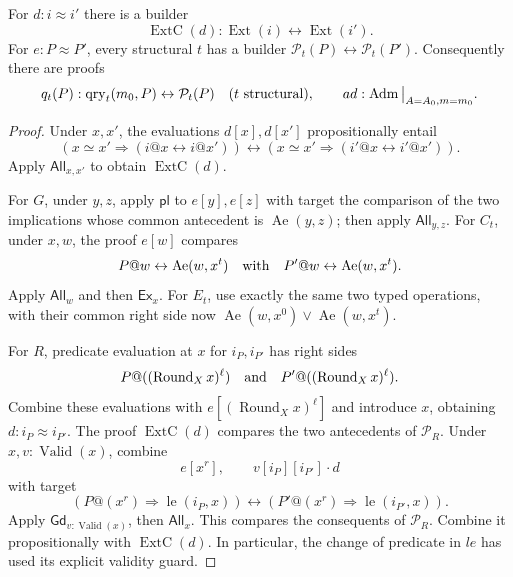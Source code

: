 \begin{lemma}
\label{rel-query-realization}
For \(d:i\approx i'\) there is a builder
\[
 \operatorname{ExtC}(d):
       \operatorname{Ext}(i)\leftrightarrow\operatorname{Ext}(i').
\]
For \(e:P\approx P'\), every structural \(t\) has a builder
\(\mathcal P_t(P)\leftrightarrow\mathcal P_t(P')\).
Consequently there are proofs
\[
 q_t(P):\operatorname{qry}_t(m_0,P)\leftrightarrow\mathcal P_t(P)
 \quad(t\ {\rm structural}),\qquad
 ad:\operatorname{Adm}\big|_{A=A_0,m=m_0}.
\]
\end{lemma}
\begin{proof}
Under \(x,x'\), the evaluations \(d[x],d[x']\) propositionally
entail
\[
 (x\simeq x'\Rightarrow(i@x\leftrightarrow i@x'))
 \leftrightarrow
 (x\simeq x'\Rightarrow(i'@x\leftrightarrow i'@x')).
\]
Apply \(\mathsf{All}_{x,x'}\) to obtain
\(\operatorname{ExtC}(d)\).

For \(G\), under \(y,z\), apply \(\mathsf{pl}\) to
\(e[y],e[z]\) with target the comparison of the two implications
whose common antecedent is \(\operatorname{Ae}(y,z)\);
then apply \(\mathsf{All}_{y,z}\).
For \(C_t\), under \(x,w\), the proof \(e[w]\) compares
\[
 P@w\leftrightarrow\operatorname{Ae}(w,x^t)
 \quad\hbox{with}\quad
 P'@w\leftrightarrow\operatorname{Ae}(w,x^t).
\]
Apply \(\mathsf{All}_w\) and then \(\mathsf{Ex}_x\).
For \(E_t\), use exactly the same two typed operations, with
their common right side now
\(\operatorname{Ae}(w,x^0)\lor\operatorname{Ae}(w,x^t)\).

For \(R\), predicate evaluation at \(x\) for \(i_P,i_{P'}\)
has right sides
\[
 P@((\operatorname{Round}_Xx)^\ell)
 \quad\hbox{and}\quad P'@((\operatorname{Round}_Xx)^\ell).
\]
Combine these evaluations with
\(e[(\operatorname{Round}_Xx)^\ell]\) and introduce \(x\),
obtaining \(d:i_P\approx i_{P'}\).
The proof \(\operatorname{ExtC}(d)\) compares the two
antecedents of \(\mathcal P_R\).
Under \(x,v:\operatorname{Valid}(x)\), combine
\[
 e[x^r],\qquad v[i_P][i_{P'}]\cdot d
\]
with target
\[
 (P@(x^r)\Rightarrow \operatorname{le}(i_P,x))
   \leftrightarrow(P'@(x^r)\Rightarrow \operatorname{le}(i_{P'},x)).
\]
Apply \(\mathsf{Gd}_{v:\operatorname{Valid}(x)}\), then
\(\mathsf{All}_x\).  This compares the consequents of
\(\mathcal P_R\).  Combine it propositionally with
\(\operatorname{ExtC}(d)\).  In particular, the change of
predicate in \(le\) has used its explicit validity guard.


\end{proof}

